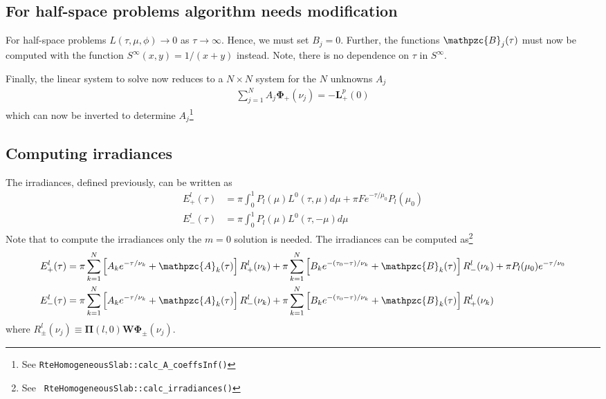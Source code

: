 \documentclass[11pt]{article}
\newcommand{\mvec}[1]{\mathbf{#1}}
\newcommand{\gvec}[1]{\boldsymbol{#1}}
\newcommand{\script}[1]{\mathpzc{#1}}
\begin{document}
\subsection{For half-space problems algorithm needs modification}
For half-space problems $L(\tau,\mu,\phi) \rightarrow 0$ as $\tau
\rightarrow \infty$. Hence, we must set $B_j = 0$. Further, the
functions $\script{B}_j(\tau)$ must now be computed with the
function $S^\infty(x,y) = 1/(x+y)$ instead. Note, there is no
dependence on $\tau$ in $S^\infty$.

Finally, the linear system to solve now reduces to a $N\times N$
system for the $N$ unknowns $A_j$
\begin{align}
  \sum_{j=1}^N
  A_j \gvec{\Phi}_+(\nu_j) = -\mvec{L}_+^p(0)
\end{align}
which can now be inverted to determine $A_j$\footnote{See
  {\tt RteHomogeneousSlab::calc\_A\_coeffsInf()}}




\subsection{Computing irradiances}
The irradiances, defined previously, can be written as
\begin{align}
  E_+^l(\tau) &= \pi \int_0^1
  P_l(\mu) L^0(\tau,\mu) d\mu
  + \pi F e^{-\tau/\mu_0} P_l(\mu_0) \\
  E_-^l(\tau) &= \pi \int_0^1
  P_l(\mu) L^0(\tau,-\mu) d\mu
\end{align}
Note that to compute the irradiances only the $m=0$ solution is
needed. The irradiances can be computed as\footnote{See {\tt
    RteHomogeneousSlab::calc\_irradiances()}}
\begin{align}
  E_+^l(\tau) &= \pi \sum_{k=1}^N
  \left[
    A_k e^{-\tau/\nu_k} + \script{A}_k(\tau)
  \right] R_+^l(\nu_k)
  + \pi \sum_{k=1}^N
  \left[
    B_k e^{-(\tau_0-\tau)/\nu_k} + \script{B}_k(\tau)
  \right] R_-^l(\nu_k)
  + \pi P_l(\mu_0) e^{-\tau/\nu_0} \\
  E_-^l(\tau) &= \pi \sum_{k=1}^N
  \left[
    A_k e^{-\tau/\nu_k} + \script{A}_k(\tau)
  \right] R_-^l(\nu_k)
  + \pi \sum_{k=1}^N
  \left[
    B_k e^{-(\tau_0-\tau)/\nu_k} + \script{B}_k(\tau)
  \right] R_+^l(\nu_k)
\end{align}
where $R_\pm^l(\nu_j) \equiv \mvec{\Pi}(l,0) \mvec{W}
\gvec{\Phi}_\pm(\nu_j)$.
\end{document}

